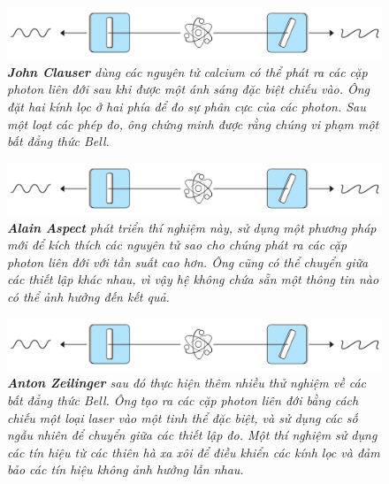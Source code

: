 \begin{multicols}{2}
\begin{figure}[H]
		\centering
		\captionsetup{labelformat= empty, justification=centering}
		\includegraphics[width= 1\linewidth]{4}
		\caption{\small\textit{\color{timhieukhoahoc}\textbf{\color{timhieukhoahoc}John Clauser} dùng các nguyên tử calcium có thể phát ra các cặp photon liên đới sau khi được một ánh sáng đặc biệt chiếu vào. Ông đặt hai kính lọc ở hai phía để đo sự phân cực của các photon. Sau một loạt các phép đo, ông chứng minh được rằng chúng vi phạm một bất đẳng thức Bell.}}
		\vspace*{-10pt}
	\end{figure}
	\begin{figure}[H]
		\vspace*{-5pt}
		\centering
		\captionsetup{labelformat= empty, justification=centering}
		\includegraphics[width= 1\linewidth]{4}
		\caption{\small\textit{\color{timhieukhoahoc}\textbf{\color{timhieukhoahoc}Alain Aspect} phát triển thí nghiệm này, sử dụng một phương pháp mới để kích thích các nguyên tử sao cho chúng phát ra các cặp photon liên đới với tần suất cao hơn. Ông cũng có thể chuyển giữa các thiết lập khác nhau, vì vậy hệ không chứa sẵn một thông tin nào có thể ảnh hưởng đến kết quả.}}
		\vspace*{-10pt}
	\end{figure}
	\begin{figure}[H]
		\vspace*{-5pt}
		\centering
		\captionsetup{labelformat= empty, justification=centering}
		\includegraphics[width= 1\linewidth]{4}
		\caption{\small\textit{\color{timhieukhoahoc}\textbf{\color{timhieukhoahoc}Anton Zeilinger} sau đó thực hiện thêm nhiều thử nghiệm về các bất đẳng thức Bell. Ông tạo ra các cặp photon liên đới bằng cách chiếu một loại laser vào một tinh thể đặc biệt, và sử dụng các số ngẫu nhiên để chuyển giữa các thiết lập đo. Một thí nghiệm sử dụng các tín hiệu từ các thiên hà xa xôi để điều khiển các kính lọc và đảm bảo các tín hiệu không ảnh hưởng lẫn nhau.}}

\end{figure}
\end{multicols}
